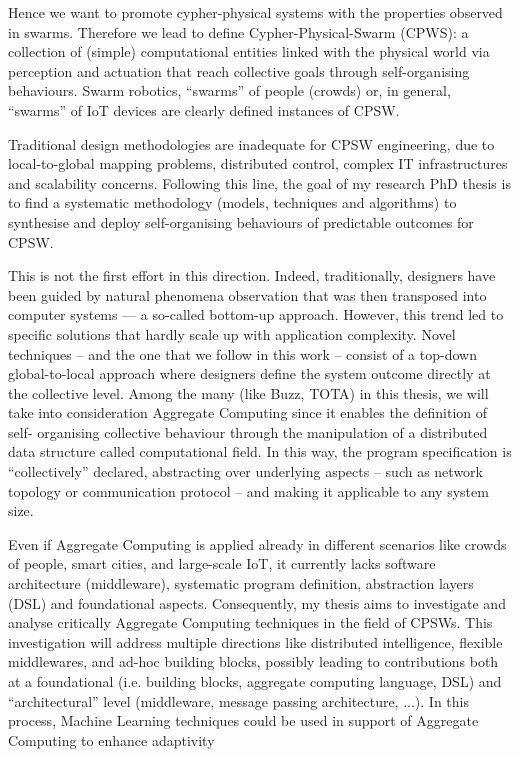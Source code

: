 \documentclass[11pt]{article}
\begin{document}
Hence we want to promote cypher-physical systems with the properties observed in swarms. Therefore we lead to define Cypher-Physical-Swarm (CPWS):
a collection of (simple) computational entities linked with the physical world via perception and actuation that reach collective goals through self-organising behaviours. Swarm robotics, ``swarms” of people (crowds) or, in general, ``swarms” of IoT devices are clearly defined instances of CPSW.

Traditional design methodologies are inadequate for CPSW engineering, due to local-to-global mapping problems, distributed control, complex IT infrastructures and scalability concerns.
Following this line, the goal of my research PhD thesis is to find a systematic methodology (models, techniques and algorithms)
to synthesise and deploy self-organising behaviours of predictable outcomes for CPSW.

This is not the first effort in this direction. Indeed, traditionally, designers have been guided
by natural phenomena observation that was then transposed into computer systems — a so-called
bottom-up approach. However, this trend led to specific solutions that hardly scale up with application complexity.
Novel techniques -- and the one that we follow in this work -- consist of a top-down global-to-local approach where designers define the system outcome directly at the collective level. Among the many (like Buzz, TOTA) in this thesis, we will take into consideration Aggregate Computing since it enables the definition of self-
organising collective behaviour through the manipulation of a distributed data structure called computational field. In this way, the program specification is “collectively” declared, abstracting over underlying aspects – such as network topology or communication protocol – and making it applicable to any system size. 

Even if Aggregate Computing is applied already in different scenarios like crowds of people, smart cities, and large-scale IoT, it currently lacks software architecture (middleware), systematic program definition, abstraction layers (DSL) and foundational aspects. Consequently, my thesis aims to investigate and analyse critically Aggregate
Computing techniques in the field of CPSWs. This investigation will address multiple directions
like distributed intelligence, flexible middlewares, and ad-hoc building blocks, possibly leading to
contributions both at a foundational (i.e. building blocks, aggregate computing language,  DSL) and “architectural” level (middleware, message passing architecture, ...). In this process, Machine Learning techniques could be used in support of Aggregate Computing to enhance adaptivity
\end{document}
